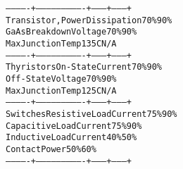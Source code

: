 \begin{boxedminipage}{\funcwidth}
\begin{alltt}
-------------+----------------------------+---------+---------+
 Transistor, {\textbar} Power Dissipation          {\textbar}   70\%   {\textbar}   90\%   {\textbar}
 GaAs        {\textbar} Breakdown Voltage          {\textbar}   70\%   {\textbar}   90\%   {\textbar}
             {\textbar} Max Junction Temp          {\textbar}  135C   {\textbar}   N/A   {\textbar}
-------------+----------------------------+---------+---------+
 Thyristors  {\textbar} On-State Current           {\textbar}   70\%   {\textbar}   90\%   {\textbar}
             {\textbar} Off-State Voltage          {\textbar}   70\%   {\textbar}   90\%   {\textbar}
             {\textbar} Max Junction Temp          {\textbar}  125C   {\textbar}   N/A   {\textbar}
-------------+----------------------------+---------+---------+
 Switches    {\textbar} Resistive Load Current     {\textbar}   75\%   {\textbar}   90\%   {\textbar}
             {\textbar} Capacitive Load Current    {\textbar}   75\%   {\textbar}   90\%   {\textbar}
             {\textbar} Inductive Load Current     {\textbar}   40\%   {\textbar}   50\%   {\textbar}
             {\textbar} Contact Power              {\textbar}   50\%   {\textbar}   60\%   {\textbar}
-------------+----------------------------+---------+---------+
\end{alltt}

\setlength{\parskip}{1ex}
    \end{boxedminipage}

    \label{reliafree:calculations:similar_hazard_rate}

    \vspace{0.5ex}

